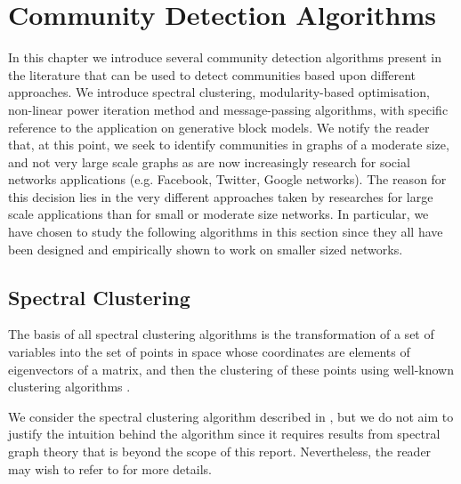 
\chapter{Community Detection Algorithms}

\label{cha:communityDetectionAlgorithms}


In this chapter we introduce several community detection algorithms present in the literature that can be used to detect communities based upon different approaches.
We introduce spectral clustering, modularity-based optimisation, non-linear power iteration method and message-passing algorithms, with specific reference to the application on generative block models.
We notify the reader that, at this point, we seek to identify communities in graphs of a moderate size, and not very large scale graphs as are now increasingly research for social networks applications (e.g. Facebook, Twitter, Google networks).
The reason for this decision lies in the very different approaches taken by researches for large scale applications than for small or moderate size networks.
In particular, we have chosen to study the following algorithms in this section since they all have been designed and empirically shown to work on smaller sized networks.


\section{Spectral Clustering}
\label{sec:spectralClustering}

The basis of all spectral clustering algorithms is the transformation of a set of variables into the set of points in space whose coordinates are elements of eigenvectors of a matrix, and then the clustering of these points using well-known clustering algorithms \cite{Lux06,For10}.


We consider the spectral clustering algorithm described in \cite{Lux06,For10}, but we do not aim to justify the intuition behind the algorithm since it requires results from spectral graph theory that is beyond the scope of this report.
Nevertheless, the reader may wish to refer to \cite{Lux06,Spi07,For10} for more details.

